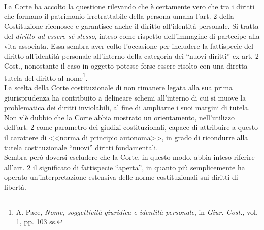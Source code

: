 \\La Corte ha accolto la questione rilevando che è certamente vero che tra i diritti che formano il patrimonio irretrattabile della persona umana l'art. 2 della Costituzione riconosce e garantisce anche il diritto all'identità personale. Si tratta del\textit{ diritto ad essere sé stesso}, inteso come rispetto dell'immagine di partecipe alla vita associata.
Essa sembra aver colto l’occasione per includere la fattispecie del diritto all'identità personale all’interno della categoria dei “nuovi diritti” ex art. 2 Cost., nonostante il caso in oggetto potesse forse essere risolto con una diretta tutela del diritto al nome\footnote{A. Pace, \textit{Nome, soggettività giuridica e identità personale}, in \textit{Giur. Cost.}, vol. 1, pp. 103 ss.}.
\\La scelta della Corte costituzionale di non rimanere legata alla sua prima giurisprudenza ha contribuito a delineare schemi all'interno di cui si muove la problematica dei diritti inviolabili, al fine di ampliarne i suoi margini di tutela. 
\\Non v’è dubbio che la Corte abbia mostrato un orientamento, nell’utilizzo dell’art. 2 come parametro dei giudizi costituzionali, capace di attribuire a questo il carattere di <<norma di principio autonoma>>, in grado di ricondurre alla tutela costituzionale “nuovi” diritti fondamentali. 
\\Sembra però doversi escludere che la Corte, in questo modo, abbia inteso riferire all’art. 2 il significato di fattispecie “aperta”, in quanto più semplicemente ha operato un’interpretazione estensiva delle norme costituzionali sui diritti di libertà.


